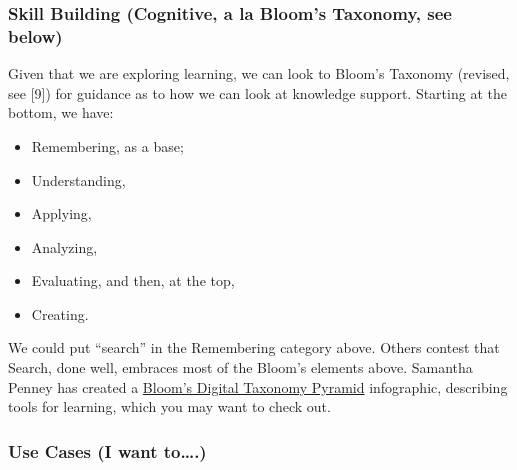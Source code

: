 \subsubsection{Skill Building (Cognitive, a la Bloom's Taxonomy, see
below)}

Given that we are exploring learning, we can look to Bloom's Taxonomy
(revised, see {[}9{]}) for guidance as to how we can look at knowledge
support. Starting at the bottom, we have:

\begin{itemize}
\itemsep1pt\parskip0pt
\item
  Remembering, as a base;
\end{itemize}

\begin{itemize}
\itemsep1pt\parskip0pt
\item
  Understanding,
\end{itemize}

\begin{itemize}
\itemsep1pt\parskip0pt
\item
  Applying,
\end{itemize}

\begin{itemize}
\itemsep1pt\parskip0pt
\item
  Analyzing,
\end{itemize}

\begin{itemize}
\itemsep1pt\parskip0pt
\item
  Evaluating, and then, at the top,
\end{itemize}

\begin{itemize}
\itemsep1pt\parskip0pt
\item
  Creating.
\end{itemize}

We could put ``search'' in the Remembering category above. Others
contest that Search, done well, embraces most of the Bloom's elements
above. Samantha Penney has created a
\href{http://www.usi.edu/distance/bdt.htm}{Bloom's Digital Taxonomy
Pyramid} infographic, describing tools for learning, which you may want
to check out.

\subsubsection{Use Cases (I want to\ldots{}.)}

